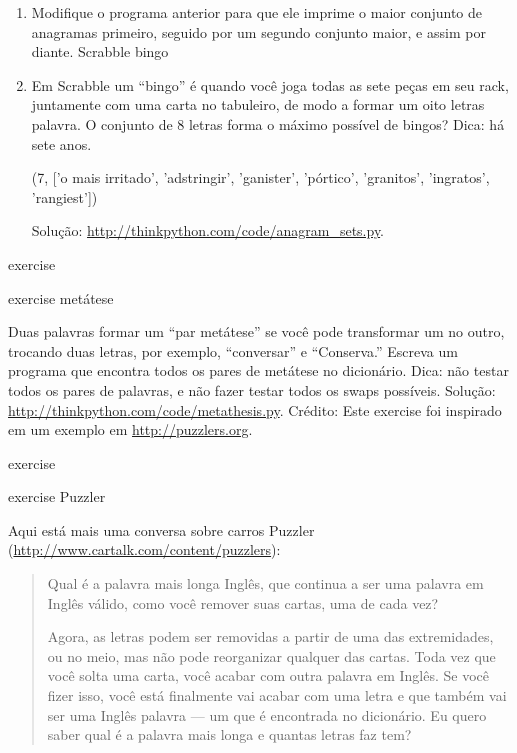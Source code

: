 \documentclass[10pt]{book}
\begin{document}
\begin{exercise}
\begin{v erbatim}
\begin{}
\begin{enumerate}
\item Modifique o programa anterior para que ele imprime o maior conjunto
de anagramas primeiro, seguido por um segundo conjunto maior, e assim por diante.
\index{} Scrabble
\index{} bingo

\item Em Scrabble um ``bingo'' é quando você joga todas as sete peças em
seu rack, juntamente com uma carta no tabuleiro, de modo a formar um oito letras
palavra. O conjunto de 8 letras forma o máximo possível de bingos?
Dica: há sete anos.

(7, ['o mais irritado', 'adstringir', 'ganister', 'pórtico', 'granitos',
'ingratos', 'rangiest'])

Solução: \url{http://thinkpython.com/code/anagram_sets.py}.

\end{enumerate}
\end{} exercise

\begin{} exercise
\index{} metátese

Duas palavras formar um ``par metátese'' se você pode transformar um no
outro, trocando duas letras, por exemplo, ``conversar'' e
``Conserva.'' Escreva um programa que encontra todos os pares de metátese
no dicionário. Dica: não testar todos os pares de palavras, e não fazer
testar todos os swaps possíveis. Solução: \url{http://thinkpython.com/code/metathesis.py}.
Crédito: Este exercise foi inspirado em um exemplo em \url{http://puzzlers.org}.

\end{} exercise



\begin{} exercise
\index{} Puzzler

Aqui está mais uma conversa sobre carros Puzzler
(\url{http://www.cartalk.com/content/puzzlers}):

\begin{quote}
Qual é a palavra mais longa Inglês, que continua a ser uma palavra em Inglês válido,
como você remover suas cartas, uma de cada vez?

Agora, as letras podem ser removidas a partir de uma das extremidades, ou no meio, mas
não pode reorganizar qualquer das cartas. Toda vez que você solta uma carta, você
acabar com outra palavra em Inglês. Se você fizer isso, você está finalmente
vai acabar com uma letra e que também vai ser uma
Inglês palavra --- um que é encontrada no dicionário. Eu quero saber
qual é a palavra mais longa e quantas letras faz
tem?


\end{quote}
\end{}
\end{v erbatim}
\end{exercise}
\end{document}
